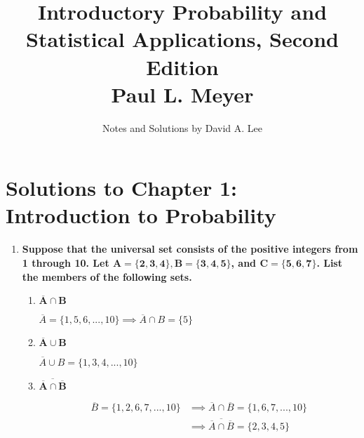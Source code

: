 \documentclass[10pt, oneside]{article}   	%
\title{Introductory Probability and Statistical Applications, Second Edition \\
\large{Paul L. Meyer}}
\author{Notes and Solutions by David A. Lee }
\date{}							%
\theoremstyle{definition}
\begin{document}
\maketitle
\section*{Solutions to Chapter 1: Introduction to Probability}

\begin{enumerate}[label=1.\arabic*]
\itemsep0em 
\item  \begin{tcolorbox}[
  colback=Cerulean!5!white,
  colframe=Cerulean!75!black]
\textbf{Suppose that the universal set consists of the positive integers from 1 through 10. Let $\bm{A = \{ 2, 3, 4 \}, B = \{ 3, 4, 5 \}}$, and $\bm{C = \{ 5, 6, 7 \}}$. List the members of the following sets.}
\end{tcolorbox}

	\begin{enumerate} 
	\item  \begin{tcolorbox}[
	  colback=Cerulean!5!white,
	  colframe=Cerulean!75!black]
	\textbf{$\bm{\overline{A} \cap B}$}
	\end{tcolorbox}
	
	$\overline{A} = \{1, 5, 6, ..., 10 \} \implies \boxed{\overline{A} \cap B = \{ 5 \}}$
	
	\item  \begin{tcolorbox}[
	  colback=Cerulean!5!white,
	  colframe=Cerulean!75!black]
	\textbf{$\bm{\overline{A} \cup B}$}
	\end{tcolorbox}
	
	$\boxed{\overline{A} \cup B = \{ 1, 3, 4, ..., 10 \}}$
	
	\item  \begin{tcolorbox}[
	  colback=Cerulean!5!white,
	  colframe=Cerulean!75!black]
	\textbf{$\bm{\overline{\overline{A} \cap \overline{B}}}$}
	\end{tcolorbox}
	
	\begin{align*}
	\overline{B} = \{ 1, 2, 6, 7, ..., 10 \} &\implies \overline{A} \cap \overline{B} = \{ 1, 6, 7, ..., 10\} \\
	&\implies \boxed{ \overline{\overline{A} \cap \overline{B}} = \{2, 3, 4, 5 \} }
	\end{align*}
	

\end{enumerate}
\end{enumerate}
\end{document}
